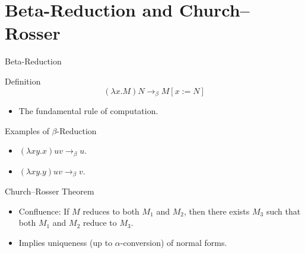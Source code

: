 \documentclass{beamer}
\begin{document}
  
  



\section{Beta-Reduction and Church–Rosser}
\begin{frame}{Beta-Reduction}
  \begin{block}{Definition}
    \[
    (\lambda x.M)N \rightarrow_\beta M[x:=N]
    \]
    \begin{itemize}
      \item The fundamental rule of computation.
    \end{itemize}
  \end{block}
\end{frame}

\begin{frame}{Examples of $\beta$-Reduction}
  \begin{itemize}
    \item \((\lambda xy.x)uv \rightarrow_\beta u\).
    \item \((\lambda xy.y)uv \rightarrow_\beta v\).
  \end{itemize}
\end{frame}

\begin{frame}{Church–Rosser Theorem}
  \begin{itemize}
    \item Confluence: If \( M \) reduces to both \( M_1 \) and \( M_2 \), then there exists \( M_3 \) such that both \( M_1 \) and \( M_2 \) reduce to \( M_3 \).
    \item Implies uniqueness (up to $\alpha$-conversion) of normal forms.
  \end{itemize}
\end{frame}
\end{document}
